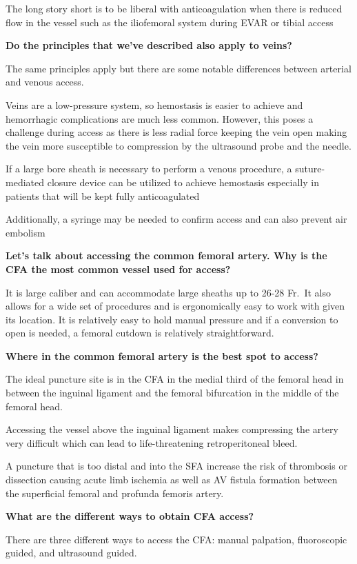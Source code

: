 \documentclass[
]{book}
\begin{document}
The long story short is to be liberal with anticoagulation when there is
reduced flow in the vessel such as the iliofemoral system during EVAR or
tibial access

\textbf{Do the principles that we've described also apply to veins?}

The same principles apply but there are some notable differences between
arterial and venous access.

Veins are a low-pressure system, so hemostasis is easier to achieve and
hemorrhagic complications are much less common. However, this poses a
challenge during access as there is less radial force keeping the vein
open making the vein more susceptible to compression by the ultrasound
probe and the needle.

If a large bore sheath is necessary to perform a venous procedure, a
suture-mediated closure device can be utilized to achieve hemostasis
especially in patients that will be kept fully anticoagulated

Additionally, a syringe may be needed to confirm access and can also
prevent air embolism

\textbf{Let's talk about accessing the common femoral artery. Why is the CFA
the most common vessel used for access?}

It is large caliber and can accommodate large sheaths up to 26-28 Fr.~It
also allows for a wide set of procedures and is ergonomically easy to
work with given its location. It is relatively easy to hold manual
pressure and if a conversion to open is needed, a femoral cutdown is
relatively straightforward.

\textbf{Where in the common femoral artery is the best spot to access?}

The ideal puncture site is in the CFA in the medial third of the femoral
head in between the inguinal ligament and the femoral bifurcation in the
middle of the femoral head.

Accessing the vessel above the inguinal ligament makes compressing the
artery very difficult which can lead to life-threatening retroperitoneal
bleed.

A puncture that is too distal and into the SFA increase the risk of
thrombosis or dissection causing acute limb ischemia as well as AV
fistula formation between the superficial femoral and profunda femoris
artery.

\textbf{What are the different ways to obtain CFA access?}

There are three different ways to access the CFA: manual palpation,
fluoroscopic guided, and ultrasound guided.
\end{document}
